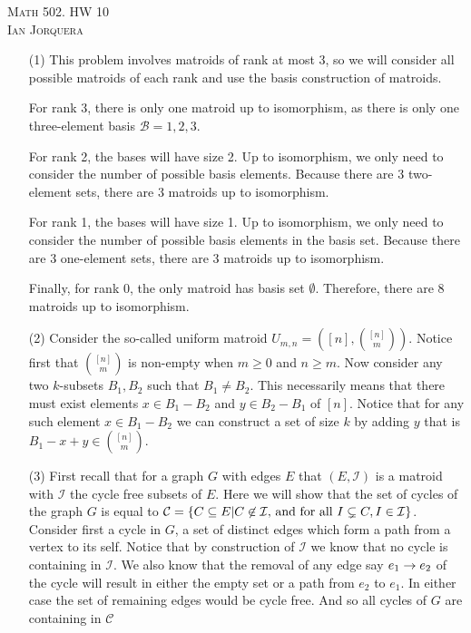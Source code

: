 \documentclass[12pt]{amsart}
\begin{document}
\begin{center}
    \textsc{Math 502. HW 10\\ Ian Jorquera}
\end{center}
\vspace{1em}

\begin{itemize}
\item[(1)] %
This problem involves matroids of rank at most 3, so we will consider all possible matroids of each rank and use the basis construction of matroids.

For rank 3, there is only one matroid up to isomorphism, as there is only one three-element basis $\mathcal{B}={1,2,3}$.

For rank 2, the bases will have size 2. Up to isomorphism, we only need to consider the number of possible basis elements. Because there are 3 two-element sets, there are 3 matroids up to isomorphism.

For rank 1, the bases will have size 1. Up to isomorphism, we only need to consider the number of possible basis elements in the basis set. Because there are 3 one-element sets, there are 3 matroids up to isomorphism.

Finally, for rank 0, the only matroid has basis set ${\emptyset}$. Therefore, there are 8 matroids up to isomorphism.\\

\item[(2)]
Consider the so-called uniform matroid $U_{m,n}=([n],{[n]\choose m})$. Notice first that ${[n]\choose m}$ is non-empty when $m\geq 0$ and $n\geq m$. Now consider any two $k$-subsets $B_1, B_2$ such that $B_1\neq B_2$. This necessarily means that there must exist elements $x\in B_1-B_2$ and $y\in B_2-B_1$ of $[n]$. Notice that for any such element $x\in B_1-B_2$ we can construct a set of size $k$ by adding $y$ that is $B_1-x+y\in {[n]\choose m}$.\\

\item[(3)] %
First recall that for a graph $G$ with edges $E$ that $(E,\mathcal{I})$ is a matroid with $\mathcal{I}$ the cycle free subsets of $E$. Here we will show that the set of cycles of the graph $G$ is equal to $\mathcal{C}=\{C\subseteq E | C\not\in \mathcal{I}\text{, and for all }I\subsetneq C, I\in\mathcal{I}\}$. Consider first a cycle in $G$, a set of distinct edges which form a path from a vertex to its self. Notice that by construction of $\mathcal{I}$ we know that no cycle is containing in $\mathcal{I}$. We also know that the removal of any edge say $e_1\rightarrow e_2$ of the cycle will result in either the empty set or a path from $e_2$ to $e_1$. In either case the set of remaining edges would be cycle free. And so all cycles of $G$ are containing in $\mathcal{C}$\\


\end{itemize}
\end{document}
